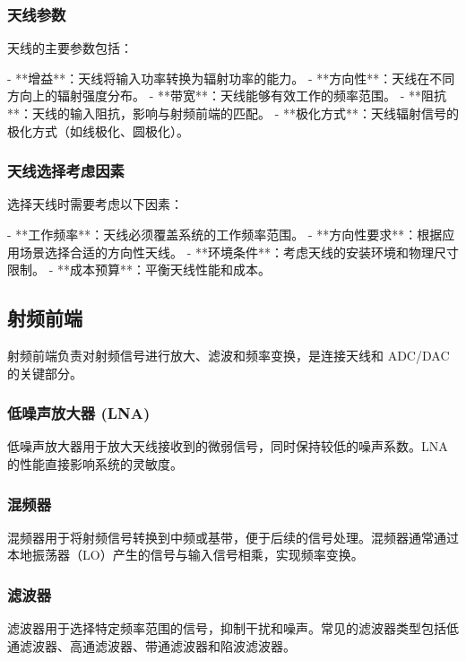 \documentclass[UTF8]{ctexbook}
\begin{document}
\subsubsection{天线参数}

天线的主要参数包括：

- **增益**：天线将输入功率转换为辐射功率的能力。
- **方向性**：天线在不同方向上的辐射强度分布。
- **带宽**：天线能够有效工作的频率范围。
- **阻抗**：天线的输入阻抗，影响与射频前端的匹配。
- **极化方式**：天线辐射信号的极化方式（如线极化、圆极化）。

\subsubsection{天线选择考虑因素}

选择天线时需要考虑以下因素：

- **工作频率**：天线必须覆盖系统的工作频率范围。
- **方向性要求**：根据应用场景选择合适的方向性天线。
- **环境条件**：考虑天线的安装环境和物理尺寸限制。
- **成本预算**：平衡天线性能和成本。

\subsection{射频前端}

射频前端负责对射频信号进行放大、滤波和频率变换，是连接天线和 ADC/DAC 的关键部分。

\subsubsection{低噪声放大器 (LNA)}

低噪声放大器用于放大天线接收到的微弱信号，同时保持较低的噪声系数。LNA 的性能直接影响系统的灵敏度。

\subsubsection{混频器}

混频器用于将射频信号转换到中频或基带，便于后续的信号处理。混频器通常通过本地振荡器（LO）产生的信号与输入信号相乘，实现频率变换。

\subsubsection{滤波器}

滤波器用于选择特定频率范围的信号，抑制干扰和噪声。常见的滤波器类型包括低通滤波器、高通滤波器、带通滤波器和陷波滤波器。
\end{document}
